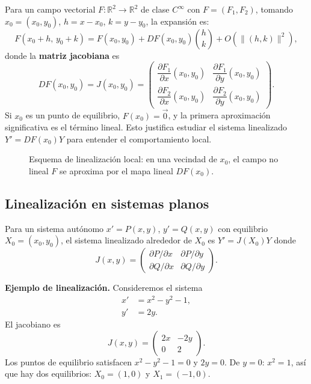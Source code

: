 \documentclass[11pt,letterpaper]{article}
\begin{document}
Para un campo vectorial $F:\mathbb{R}^2\to\mathbb{R}^2$ de clase $C^\infty$
con $F=(F_1,F_2)$, tomando $x_0=(x_0,y_0)$, $h=x-x_0$, $k=y-y_0$, la expansión es:
\[
F(x_0+h,\, y_0+k)=F(x_0,y_0)+DF(x_0,y_0)\binom{h}{k}+O(\|(h,k)\|^2),
\]
donde la \textbf{matriz jacobiana} es
\[
DF(x_0,y_0)=J(x_0,y_0)=
\begin{pmatrix}
\dfrac{\partial F_1}{\partial x}(x_0,y_0) & \dfrac{\partial F_1}{\partial y}(x_0,y_0)\\[1ex]
\dfrac{\partial F_2}{\partial x}(x_0,y_0) & \dfrac{\partial F_2}{\partial y}(x_0,y_0)
\end{pmatrix}.
\]
Si $x_0$ es un punto de equilibrio, $F(x_0)=\vec{0}$, y la primera aproximación
significativa es el término lineal. Esto justifica estudiar el sistema linealizado
$Y'=DF(x_0)Y$ para entender el comportamiento local.

\begin{figure}[H]
\centering
{}
\caption{Esquema de linealización local: en una vecindad de $x_0$,
el campo no lineal $F$ se aproxima por el mapa lineal $DF(x_0)$.}
\end{figure}

\subsection{Linealización en sistemas planos}

Para un sistema autónomo $x'=P(x,y)$, $y'=Q(x,y)$ con equilibrio $X_0=(x_0,y_0)$,
el sistema linealizado alrededor de $X_0$ es $Y'=J(X_0)Y$ donde
\[
J(x,y)=\begin{pmatrix}
\partial P/\partial x & \partial P/\partial y\\
\partial Q/\partial x & \partial Q/\partial y
\end{pmatrix}.
\]

\textbf{Ejemplo de linealización.} Consideremos el sistema
\begin{align*}
x' &= x^2-y^2-1,\\
y' &= 2y.
\end{align*}
El jacobiano es
\[
J(x,y)=\begin{pmatrix}2x & -2y\\ 0 & 2\end{pmatrix}.
\]
Los puntos de equilibrio satisfacen $x^2-y^2-1=0$ y $2y=0$. De $y=0$:
$x^2=1$, así que hay dos equilibrios: $X_0=(1,0)$ y $X_1=(-1,0)$.
\end{document}
